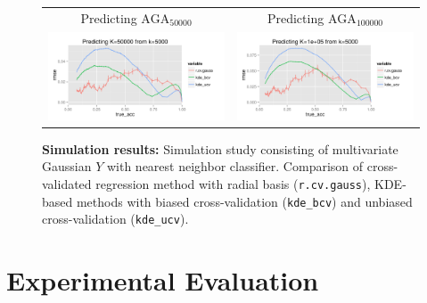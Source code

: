 \documentclass[twoside,11pt]{article}
\newenvironment{myfont}{\fontfamily{phv}\selectfont}{\par}
\begin{document}
\begin{figure}
\begin{tabular}{cc}
\begin{myfont}Predicting $\text{AGA}_{50000}$\end{myfont} &
\begin{myfont}Predicting $\text{AGA}_{100000}$\end{myfont}\\
\includegraphics[scale = 0.55, clip = true, trim = 0 0 0 0in]{sim_large7_K50_k5.png} &
\includegraphics[scale = 0.55, clip = true, trim = 0 0 0 0in]{sim_large7_K100_k5.png}\\ 
\end{tabular}
\caption{\textbf{Simulation results:} Simulation study consisting of
  multivariate Gaussian $Y$ with nearest neighbor classifier.
  Comparison of cross-validated regression method with radial basis
  ({\tt r.cv.gauss}), KDE-based methods with biased cross-validation
  ({\tt kde\_bcv}) and unbiased cross-validation ({\tt kde\_ucv}).}
\label{fig:sim_study}
\end{figure}







\section{Experimental Evaluation}\label{sec:extrapolation_example}
\end{document}
